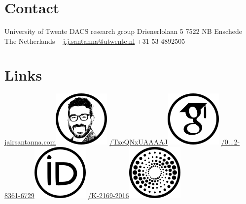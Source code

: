 \documentclass[print]{styles/friggeri-cv-mac} %
\begin{document}

\begin{aside} 
 \section{Contact}
University of Twente
DACS research group
Drienerlolaan 5 
7522 NB Enschede
The Netherlands
~
\href{mailto:j.j.santanna@utwente.nl}{j.j.santanna@utwente.nl}
+31 53 4892505
~
\section{Links}\hspace{-1cm}
\hspace{-0.5cm}\href{http://www.jairsantanna.com}{jairsantanna.com}\includegraphics[scale=0.4]{img/jairsantanna.png}
\href{https://scholar.google.com/citations?user=TxcQNxUAAAAJ}{/TxcQNxUAAAAJ}\includegraphics[scale=0.3]{img/googlescholar.png}
\href{http://orcid.org/0000-0002-8361-6729}{/0...2-8361-6729}\includegraphics[scale=0.3]{img/orcid.png}
\href{http://www.researcherid.com/rid/K-2169-2016}{/K-2169-2016}\includegraphics[scale=0.3]{img/researchid.png}

\end{aside}
\end{document}
